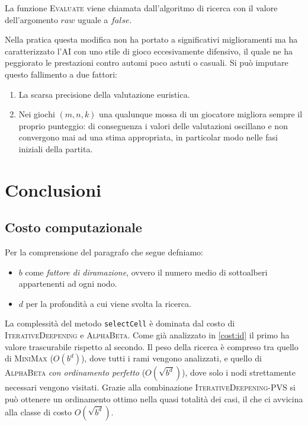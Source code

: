 \documentclass{article}
\begin{document}
La funzione \textsc{Evaluate} viene chiamata dall'algoritmo di ricerca con il valore
dell'argomento $raw$ uguale a $false$.

Nella pratica questa modifica non ha portato a significativi miglioramenti
ma ha caratterizzato l'AI con uno stile di gioco eccesivamente difensivo, il
quale ne ha peggiorato le prestazioni contro automi poco astuti o casuali.
Si pu\`o imputare questo fallimento a due fattori:
\begin{enumerate}
  \item La scarsa precisione della valutazione euristica.
  \item Nei giochi $(m, n, k)$ una qualunque mossa di un giocatore migliora sempre
    il proprio punteggio: di conseguenza i valori delle valutazioni oscillano e
    non convergono mai ad una stima appropriata, in particolar modo nelle fasi
    iniziali della partita.
\end{enumerate}

\section{Conclusioni}

\subsection{Costo computazionale}

Per la comprensione del paragrafo che segue defniamo:
\begin{itemize}
  \item $b$ come \emph{fattore di diramazione}, ovvero il numero medio di
    sottoalberi appartenenti ad ogni nodo.
  \item $d$ per la profondit\`a a cui viene svolta la ricerca.
\end{itemize}

La complessit\`a del metodo \verb!selectCell! \`e dominata dal costo di
\textsc{IterativeDeepening} e \textsc{AlphaBeta}. Come gi\`a analizzato in \ref{cost:id}
il primo ha valore trascurabile rispetto al secondo. Il peso della ricerca \`e
compreso tra quello di \textsc{MiniMax} ($O(b^d)$), dove tutti i rami vengono
analizzati, e quello di \textsc{AlphaBeta} \emph{con ordinamento perfetto}
($O(\sqrt{b^d})$), dove solo i nodi strettamente necessari vengono visitati.
Grazie alla combinazione \textsc{IterativeDeepening}-\textsc{PVS} si pu\`o
ottenere un ordinamento ottimo nella quasi totalit\`a dei casi, il che ci avvicina
alla classe di costo $O(\sqrt{b^d})$.
\end{document}
